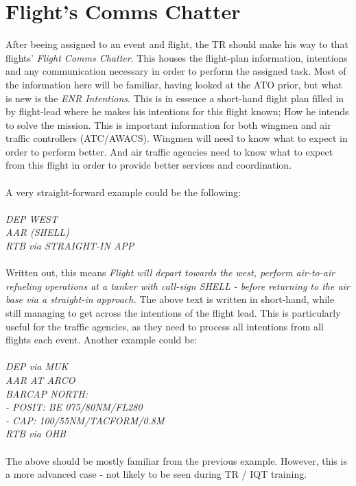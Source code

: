 \section{Flight's Comms Chatter}
	\textnormal{
    	After beeing assigned to an event and flight, the TR should make his way to that flights' \textit{Flight Comms Chatter}. This houses the flight-plan information, intentions and any communication necessary in order to perform the assigned task. Most of the information here will be familiar, having looked at the ATO prior, but what is new is the \textit{ENR Intentions}. This is in essence a short-hand flight plan filled in by flight-lead where he makes his intentions for this flight known; How he intends to solve the mission. This is important information for both wingmen and air traffic controllers (ATC/AWACS). Wingmen will need to know what to expect in order to perform better. And air traffic agencies need to know what to expect from this flight in order to provide better services and coordination. \\ \\
        A very straight-forward example could be the following: \\ \\
        \footnotesize
        \textit{DEP WEST \\ AAR (SHELL) \\ RTB via STRAIGHT-IN APP\\ \\}
        \normalsize
        Written out, this means \textit{Flight will depart towards the west, perform air-to-air refueling operations at a tanker with call-sign SHELL - before returning to the air base via a straight-in approach.} The above text is written in short-hand, while still managing to get across the intentions of the flight lead. This is particularly useful for the traffic agencies, as they need to process all intentions from all flights each event. Another example could be: \\ \\
        \footnotesize
        \textit{DEP via MUK \\ AAR AT ARCO \\ BARCAP NORTH: \\ - POSIT: BE 075\degree/80NM/FL280 \\ - CAP: 100\degree/55NM/TACFORM/0.8M \\ RTB via OHB\\ \\}
        \normalsize
        The above should be mostly familiar from the previous example. However, this is a more advanced case - not likely to be seen during TR / IQT training. 
}
